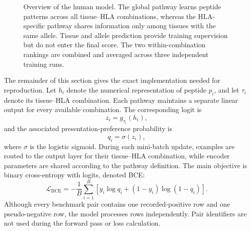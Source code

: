 \begin{figure}[t]
\centering
{}
\caption{Overview of the human model. The global pathway learns peptide patterns across all tissue--HLA combinations, whereas the HLA-specific pathway shares information only among tissues with the same allele. Tissue and allele prediction provide training supervision but do not enter the final score. The two within-combination rankings are combined and averaged across three independent training runs.}
\label{fig:tissuepmhc-architecture}
\end{figure}

The remainder of this section gives the exact implementation needed for reproduction. Let \(h_i\) denote the numerical representation of peptide \(p_i\), and let \(\tau_i\) denote its tissue--HLA combination. Each pathway maintains a separate linear output for every available combination. The corresponding logit is
\[
z_i=g_{\tau_i}(h_i),
\]
and the associated presentation-preference probability is
\[
q_i=\sigma(z_i),
\]
where \(\sigma\) is the logistic sigmoid. During each mini-batch update, examples are routed to the output layer for their tissue--HLA combination, while encoder parameters are shared according to the pathway definition. The main objective is binary cross-entropy with logits, denoted BCE:
\[
\mathcal{L}_{\mathrm{BCE}}
=
-\frac{1}{B}
\sum_{i=1}^{B}
\left[
y_i\log q_i+(1-y_i)\log(1-q_i)
\right].
\]
Although every benchmark pair contains one recorded-positive row and one pseudo-negative row, the model processes rows independently. Pair identifiers are not used during the forward pass or loss calculation.

